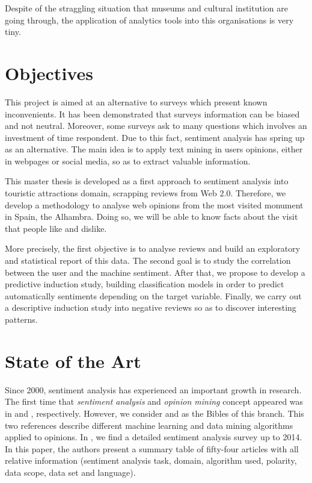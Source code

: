 \documentclass[a4paper,10pt]{book}
\begin{document}
Despite of the straggling situation that museums and cultural institution are going through, the application of analytics tools into this organisations is very tiny.



  
  \section{Objectives} \label{sec:objectives}
This project is aimed at an alternative to surveys which present known inconvenients. It has been demonstrated that surveys information can be biased and not neutral. Moreover, some surveys ask to many questions which involves an investment of time respondent. Due to this fact, sentiment analysis has spring up as an alternative. The main idea is to apply text mining in users opinions, either in webpages or social media, so as to extract valuable information.

This master thesis is developed as a first approach to sentiment analysis into touristic attractions domain, scrapping reviews from Web 2.0. Therefore, we develop a methodology to analyse web opinions from the most visited monument in Spain, the Alhambra. Doing so, we will be able to know facts about the visit that people like and dislike. 

More precisely, the first objective is to analyse reviews and build an exploratory and statistical report of this data. The second goal is to study the correlation between the user and the machine sentiment. After that, we propose to develop a predictive induction study, building classification models in order to predict automatically sentiments depending on the target variable.  Finally, we carry out a descriptive induction study into negative reviews so as to discover interesting patterns. 


  
  \section{State of the Art} \label{sec:stateofart}
	Since 2000, sentiment analysis has experienced an important growth in research. The first time that \textit{sentiment analysis} and \textit{opinion mining} concept appeared was in \cite{yi2003sentiment} and \cite{dave2003mining}, respectively.   However, we consider \cite{liu2012sentiment} and \cite{pang2008opinion} as the Bibles of this branch. This two references describe different machine learning and data mining algorithms applied to opinions. In \cite{medhat2014sentiment}, we find a detailed sentiment analysis survey up to 2014. In this paper, the authors present a summary table of fifty-four articles  with all relative information (sentiment analysis task, domain, algorithm used, polarity, data scope, data set and language).
	
\end{document}
